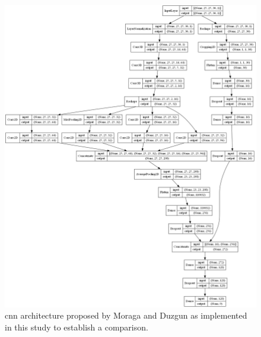 \begin{figure}[ht]
    \centering
    \includegraphics[width=\linewidth]{figs/vineyard_classification/networks/jigsaw_hsi_25x24_0.png}
	\caption{\acrshort{cnn} architecture proposed by Moraga and Duzgun \cite{moraga_jigsawhsi_2022} as implemented in this study to establish a comparison. }
	\label{fig:jigsaw_cnn}
\end{figure}


